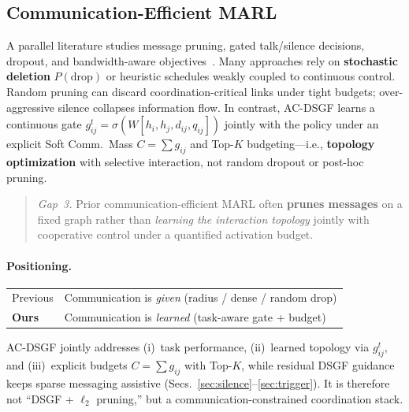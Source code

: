 \subsection{Communication-Efficient MARL}
A parallel literature studies message pruning, gated talk/silence decisions,
dropout, and bandwidth-aware objectives~\cite{singh2019learning,
wang2020learning,foerster2016learning,sukhbaatar2016commnet,das2019tarmac,
kim2019learning,mordatch2018emergent}.
Many approaches rely on \textbf{stochastic deletion}
$P(\mathrm{drop})$ or heuristic schedules weakly coupled to continuous
control.
Random pruning can discard coordination-critical links under tight budgets;
over-aggressive silence collapses information flow.
In contrast, AC-DSGF learns a continuous gate
$g_{ij}^{t}=\sigma(W[h_i,h_j,d_{ij},q_{ij}])$ jointly with the policy under
an explicit Soft Comm.\ Mass $C=\sum g_{ij}$ and Top-$K$ budgeting---i.e.,
\textbf{topology optimization} with selective interaction, not random dropout
or post-hoc pruning.
\begin{quote}
\emph{Gap~3.}
Prior communication-efficient MARL often \textbf{prunes messages} on a fixed
graph rather than \emph{learning the interaction topology} jointly with
cooperative control under a quantified activation budget.
\end{quote}

\paragraph{Positioning.}
\begin{center}
\begin{tabular}{@{}ll@{}}
\toprule
Previous & Communication is \emph{given} (radius / dense / random drop) \\
\textbf{Ours} & Communication is \emph{learned} (task-aware gate + budget) \\
\bottomrule
\end{tabular}
\end{center}
\vspace{0.25em}
\noindent
AC-DSGF jointly addresses
(i)~task performance,
(ii)~learned topology via $g_{ij}^{t}$, and
(iii)~explicit budgets $C=\sum g_{ij}$ with Top-$K$, while residual DSGF
guidance keeps sparse messaging assistive
(Secs.~\ref{sec:silence}--\ref{sec:trigger}).
It is therefore not ``DSGF + $\ell_2$ pruning,'' but a
communication-constrained coordination stack.
